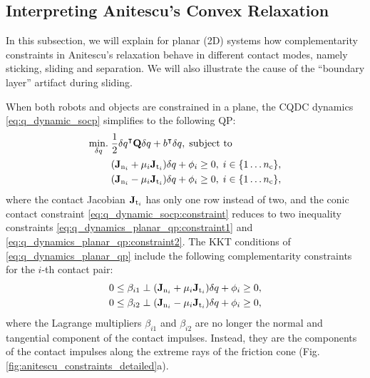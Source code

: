 \subsection{Interpreting Anitescu's Convex Relaxation} \label{sec:quasi_static:artifacts}
In this subsection, we will explain for planar (2D) systems how complementarity constraints in Anitescu's relaxation behave in different contact modes, namely sticking, sliding and separation. We will also illustrate the cause of the ``boundary layer'' artifact during sliding.

When both robots and objects are constrained in a plane, the CQDC dynamics \eqref{eq:q_dynamic_socp} simplifies to the following QP:
\begin{subequations}
\label{eq:q_dynamics_planar_qp}
\begin{align}
\underset{\dq}{\minimize} \; &\frac{1}{2} \dq^\intercal \mathbf{Q} \dq + b^\intercal \dq, \; \text{subject to} \\
&(\Jn[i] + \mu_i \Jt[i]) \dq + \phi_i \geq 0, \; i \in \{1\dots\nC\}, \label{eq:q_dynamics_planar_qp:constraint1}\\
&(\Jn[i] - \mu_i \Jt[i]) \dq + \phi_i \geq 0, \; i \in \{1\dots\nC\}, \label{eq:q_dynamics_planar_qp:constraint2}
\end{align}
\end{subequations}
where the contact Jacobian $\Jt[i]$ has only one row instead of two, and the conic contact constraint \eqref{eq:q_dynamic_socp:constraint} reduces to two inequality constraints \eqref{eq:q_dynamics_planar_qp:constraint1} and \eqref{eq:q_dynamics_planar_qp:constraint2}. The KKT conditions of \eqref{eq:q_dynamics_planar_qp} include the following complementarity constraints for the $i$-th contact pair:
\begin{subequations}
\label{eq:anitescu_friction_single_contact}
\begin{align}
0 \leq \beta_{i1} &\perp  (\Jn[i] + \mu_i \Jt[i]) \dq + \phi_i \geq 0, \label{eq:anitescu_friction_single_contact:a}\\
0 \leq \beta_{i2} &\perp  (\Jn[i] - \mu_i \Jt[i]) \dq + \phi_i \geq 0, \label{eq:anitescu_friction_single_contact:b}
\end{align}
\end{subequations}
where the Lagrange multipliers $\beta_{i1}$ and $\beta_{i2}$ are no longer the normal and tangential component of the contact impulses. Instead, they are the components of the contact impulses along the extreme rays of the friction cone (Fig. \ref{fig:anitescu_constraints_detailed}a). 

